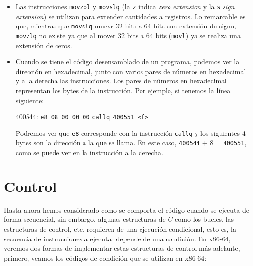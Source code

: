 \begin{itemize}
    \item Las instrucciones \texttt{movzbl} y \texttt{movslq} (la \texttt{z} indica \textit{zero extension} y la \texttt{s} \textit{sign extension}) se utilizan para extender cantidades a registros. Lo remarcable es que, mientras que \texttt{movslq} mueve 32 bits a 64 bits con extensión de signo, \texttt{movzlq} no existe ya que al mover 32 bits a 64 bits (\texttt{movl}) ya se realiza una extensión de ceros.
    \item Cuando se tiene el código desensamblado de un programa, podemos ver la dirección en hexadecimal, junto con varios pares de números en hexadecimal y a la derecha las instrucciones. Los pares de números en hexadecimal representan los bytes de la instrucción. Por ejemplo, si tenemos la línea siguiente:
    \begin{center}
        400544: \quad \texttt{e8 08 00 00 00} \quad \texttt{callq 400551 <f>}
    \end{center}
    Podremos ver que \texttt{e8} corresponde con la instrucción \texttt{callq} y los siguientes 4 bytes son la dirección a la que se llama. En este caso, \texttt{400544} + 8 = \texttt{400551}, como se puede ver en la instrucción a la derecha.
\end{itemize}


\section{Control}
Hasta ahora hemos considerado como se comporta el código cuando se ejecuta de forma secuencial, sin embargo,
algunas estructuras de $C$ como los bucles, las estructuras de control, etc. requieren de una ejecución condicional, esto es,
la secuencia de instrucciones a ejecutar depende de una condición.
En x86-64, veremos dos formas de implementar estas estructuras de control más adelante, primero, veamos
los códigos de condición que se utilizan en x86-64:
